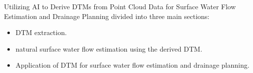 
Utilizing AI to Derive \ac{DTM}s from Point Cloud Data for Surface Water Flow Estimation and Drainage Planning
divided into three main sections: 

\begin{itemize}
    \item DTM extraction. 
    \item natural surface water flow estimation using the derived DTM.
    \item Application of DTM for surface water flow estimation and drainage planning.
\end{itemize}
